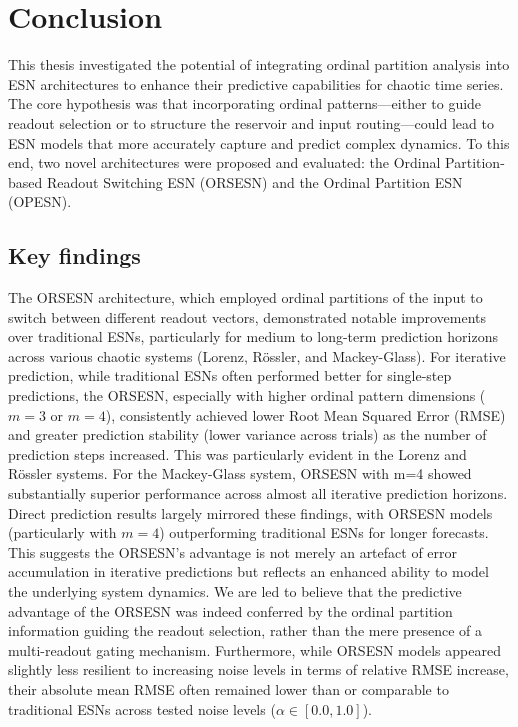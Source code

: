 
\chapter{Conclusion}

This thesis investigated the potential of integrating ordinal partition analysis into ESN architectures to enhance their predictive capabilities for chaotic time series. The core hypothesis was that incorporating ordinal patterns—either to guide readout selection or to structure the reservoir and input routing—could lead to ESN models that more accurately capture and predict complex dynamics. To this end, two novel architectures were proposed and evaluated: the Ordinal Partition-based Readout Switching ESN (ORSESN) and the Ordinal Partition ESN (OPESN).

\section{Key findings}

The ORSESN architecture, which employed ordinal partitions of the input to switch between different readout vectors, demonstrated notable improvements over traditional ESNs, particularly for medium to long-term prediction horizons across various chaotic systems (Lorenz, Rössler, and Mackey-Glass). For iterative prediction, while traditional ESNs often performed better for single-step predictions, the ORSESN, especially with higher ordinal pattern dimensions ($m=3$ or $m=4$), consistently achieved lower Root Mean Squared Error (RMSE) and greater prediction stability (lower variance across trials) as the number of prediction steps increased. This was particularly evident in the Lorenz and Rössler systems. For the Mackey-Glass system, ORSESN with m=4 showed substantially superior performance across almost all iterative prediction horizons. Direct prediction results largely mirrored these findings, with ORSESN models (particularly with $m=4$) outperforming traditional ESNs for longer forecasts. This suggests the ORSESN's advantage is not merely an artefact of error accumulation in iterative predictions but reflects an enhanced ability to model the underlying system dynamics. We are led to believe that the predictive advantage of the ORSESN was indeed conferred by the ordinal partition information guiding the readout selection, rather than the mere presence of a multi-readout gating mechanism. Furthermore, while ORSESN models appeared slightly less resilient to increasing noise levels in terms of relative RMSE increase, their absolute mean RMSE often remained lower than or comparable to traditional ESNs across tested noise levels ($\alpha\in[0.0,1.0]$).

